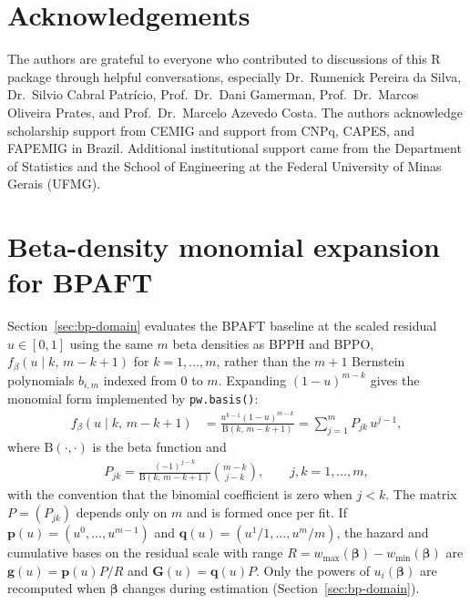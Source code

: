 \documentclass[5p,lefttitle]{elsarticle}
\begin{document}
{\section{Acknowledgements}\label{acknowledgements}

The authors are grateful to everyone who contributed to discussions of this R package through helpful conversations, especially Dr.\ Rumenick Pereira da Silva, Dr.\ Silvio Cabral Patrício, Prof.\ Dr.\ Dani Gamerman, Prof.\ Dr.\ Marcos Oliveira Prates, and Prof.\ Dr.\ Marcelo Azevedo Costa. The authors acknowledge scholarship support from CEMIG and support from CNPq, CAPES, and FAPEMIG in Brazil. Additional institutional support came from the Department of Statistics and the School of Engineering at the Federal University of Minas Gerais (UFMG).

\clearpage
\appendix

\section{Beta-density monomial expansion for BPAFT}\label{app:monomial}

Section~\ref{sec:bp-domain} evaluates the BPAFT baseline at the scaled
residual \(u\in[0,1]\) using the same \(m\) beta densities as BPPH and BPPO,
\(f_{\beta}(u\mid k,\,m-k+1)\) for \(k=1,\ldots,m\), rather than the
\(m+1\) Bernstein polynomials \(b_{i,m}\) indexed from \(0\) to \(m\).
Expanding \((1-u)^{m-k}\) gives the monomial form implemented by
\texttt{pw.basis()}:
{\footnotesize\begin{align}
f_{\beta}(u\mid k,\,m-k+1)
&=
\frac{u^{k-1}(1-u)^{m-k}}{\mathrm{B}(k,\,m-k+1)}
=
\sum_{j=1}^{m}
P_{jk}\,u^{j-1},
\end{align}\normalsize}
where \(\mathrm{B}(\cdot,\cdot)\) is the beta function and
{\footnotesize\begin{align}
P_{jk}
=
\frac{(-1)^{j-k}}{\mathrm{B}(k,\,m-k+1)}
\binom{m-k}{j-k},
\qquad j,k=1,\ldots,m,
\end{align}\normalsize}
with the convention that the binomial coefficient is zero when \(j<k\).
The matrix \(P=(P_{jk})\) depends only on \(m\) and is formed once per fit.
If \(\boldsymbol{p}(u)=(u^{0},\ldots,u^{m-1})\) and
\(\boldsymbol{q}(u)=(u^{1}/1,\ldots,u^{m}/m)\), the hazard and
cumulative bases on the residual scale with range
\(R=w_{\max}(\boldsymbol{\beta})-w_{\min}(\boldsymbol{\beta})\) are
\(\boldsymbol{g}(u)=\boldsymbol{p}(u)P/R\) and
\(\boldsymbol{G}(u)=\boldsymbol{q}(u)P\).
Only the powers of \(u_i(\boldsymbol{\beta})\) are recomputed when
\(\boldsymbol{\beta}\) changes during estimation (Section~\ref{sec:bp-domain}).

}
\end{document}
